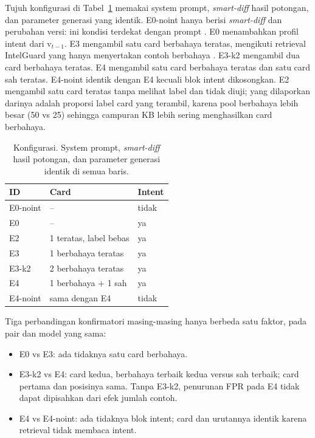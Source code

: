 \documentclass[a4paper,fleqn]{cas-dc}
\begin{document}
Tujuh konfigurasi di Tabel~\ref{tab:configs} memakai system prompt,
\emph{smart-diff} hasil potongan, dan parameter generasi yang identik.
E0-noint hanya berisi \emph{smart-diff} dan perubahan versi: ini kondisi
terdekat dengan prompt \citet{wyss2025evaluating}. E0 menambahkan profil intent
dari $\mathrm{v}_{t-1}$. E3 mengambil satu card berbahaya teratas, mengikuti
retrieval IntelGuard yang hanya menyertakan contoh berbahaya
\citep{guo2026bridging}. E3-k2 mengambil dua card berbahaya teratas. E4
mengambil satu card berbahaya teratas dan satu card sah teratas. E4-noint
identik dengan E4 kecuali blok intent dikosongkan. E2 mengambil satu card
teratas tanpa melihat label dan tidak diuji; yang dilaporkan darinya adalah
proporsi label card yang terambil, karena pool berbahaya lebih besar (50 vs 25)
sehingga campuran KB lebih sering menghasilkan card berbahaya.

\begin{table}[t]
\caption{Konfigurasi. System prompt, \emph{smart-diff} hasil potongan, dan
parameter generasi identik di semua baris.}
\label{tab:configs}
\small
\begin{tabular}{lll}
\hline
ID & Card & Intent \\
\hline
E0-noint & -- & tidak \\
E0 & -- & ya \\
E2 & 1 teratas, label bebas & ya \\
E3 & 1 berbahaya teratas & ya \\
E3-k2 & 2 berbahaya teratas & ya \\
E4 & 1 berbahaya + 1 sah & ya \\
E4-noint & sama dengan E4 & tidak \\
\hline
\end{tabular}
\end{table}

Tiga perbandingan konfirmatori masing-masing hanya berbeda satu faktor, pada
pair dan model yang sama:

\begin{itemize}
\item E0 vs E3: ada tidaknya satu card berbahaya.
\item E3-k2 vs E4: card kedua, berbahaya terbaik kedua versus sah terbaik;
card pertama dan posisinya sama. Tanpa E3-k2, penurunan FPR pada E4 tidak
dapat dipisahkan dari efek jumlah contoh.
\item E4 vs E4-noint: ada tidaknya blok intent; card dan urutannya identik
karena retrieval tidak membaca intent.
\end{itemize}
\end{document}
